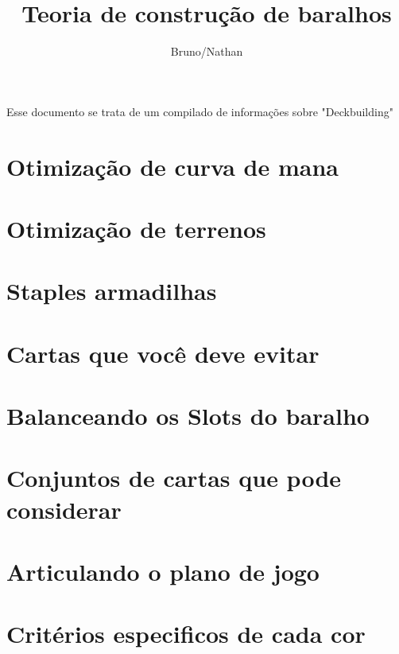 \documentclass[12pt, a4paper]{article}
\begin{document}
\bgroup\obeylines

\title{Teoria de construção de baralhos}
\author{Bruno/Nathan}
    \maketitle
 
    Esse documento se trata de um compilado de informações sobre "Deckbuilding"
    


    \section{Otimização de curva de mana}
    

    \section{Otimização de terrenos}
    

    \section{Staples armadilhas}
    

    \section{Cartas que você deve evitar}
    

    \section{Balanceando os Slots do baralho}
    

    \section{Conjuntos de cartas que pode considerar}
    

    \section{Articulando o plano de jogo}
    

    \section{Critérios especificos de cada cor}
    
\end{document}
